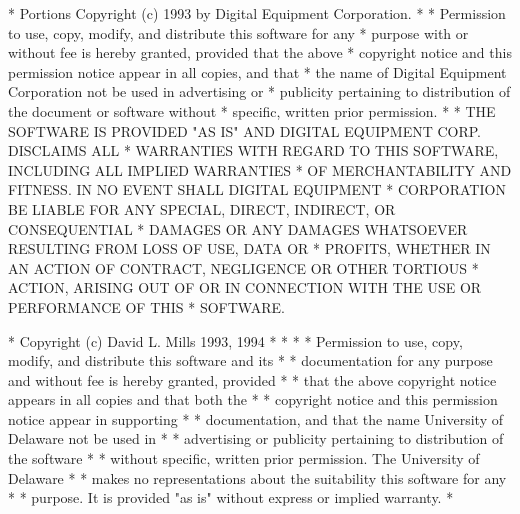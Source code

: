 \begin{copyrightEnv}
 * Portions Copyright (c) 1993 by Digital Equipment Corporation.
 *
 * Permission to use, copy, modify, and distribute this software for any
 * purpose with or without fee is hereby granted, provided that the above
 * copyright notice and this permission notice appear in all copies, and that
 * the name of Digital Equipment Corporation not be used in advertising or
 * publicity pertaining to distribution of the document or software without
 * specific, written prior permission.
 *
 * THE SOFTWARE IS PROVIDED "AS IS" AND DIGITAL EQUIPMENT CORP. DISCLAIMS ALL
 * WARRANTIES WITH REGARD TO THIS SOFTWARE, INCLUDING ALL IMPLIED WARRANTIES
 * OF MERCHANTABILITY AND FITNESS.   IN NO EVENT SHALL DIGITAL EQUIPMENT
 * CORPORATION BE LIABLE FOR ANY SPECIAL, DIRECT, INDIRECT, OR CONSEQUENTIAL
 * DAMAGES OR ANY DAMAGES WHATSOEVER RESULTING FROM LOSS OF USE, DATA OR
 * PROFITS, WHETHER IN AN ACTION OF CONTRACT, NEGLIGENCE OR OTHER TORTIOUS
 * ACTION, ARISING OUT OF OR IN CONNECTION WITH THE USE OR PERFORMANCE OF THIS
 * SOFTWARE.
\end{copyrightEnv}

\begin{copyrightEnv}
 * Copyright (c) David L. Mills 1993, 1994                                    *
 *                                                                            *
 * Permission to use, copy, modify, and distribute this software and its      *
 * documentation for any purpose and without fee is hereby granted, provided  *
 * that the above copyright notice appears in all copies and that both the    *
 * copyright notice and this permission notice appear in supporting           *
 * documentation, and that the name University of Delaware not be used in     *
 * advertising or publicity pertaining to distribution of the software        *
 * without specific, written prior permission.  The University of Delaware    *
 * makes no representations about the suitability this software for any       *
 * purpose.  It is provided "as is" without express or implied warranty.      *
\end{copyrightEnv}

